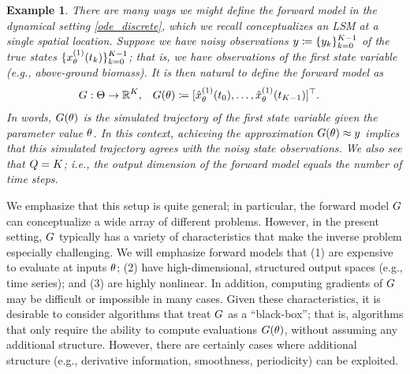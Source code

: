 \documentclass[12pt]{article}
\newtheorem{example}{Example}
\begin{document}
\begin{example}
There are many ways we might define the forward model in the dynamical setting \ref{ode_discrete}, which we recall 
conceptualizes an LSM at a single spatial location. Suppose we have noisy observations 
$\obs \Def \{\indexTime{\obs}\}_{\timeIdx=0}^{\Ntime-1}$ 
of the true states $\{\indexState[1]{\state}_{\Par}(\indexTime{\Time})\}_{\timeIdx=0}^{\Ntime-1}$; that is, we have observations of 
the first state variable (e.g., above-ground biomass). It is then natural to define the forward model as 
\begin{align}
&\fwd: \parSpace \to \R^{\Ntime}, && \fwd(\Par) 
\Def [\indexState[1]{\stateApprox}_{\Par}(\indexTime[0]{\Time}), \dots, \indexState[1]{\stateApprox}_{\Par}(\indexTime[\Ntime-1]{\Time})]^\top. \label{fwd_model}
\end{align}
In words, $\fwd(\Par)$ is the simulated trajectory of the first state variable given the parameter value $\Par$. In this context, achieving 
the approximation $\fwd(\Par) \approx \obs$ implies that this simulated trajectory agrees with the noisy state observations. We also 
see that $\dimObs = \Ntime$; i.e., the output dimension of the forward model equals the number of time steps. 
\end{example}

We emphasize that this setup is quite general; in particular, the forward model $\fwd$ can conceptualize a wide array 
of different problems. However, in the present setting, $\fwd$ typically has a variety of characteristics that make 
the inverse problem especially challenging. We will emphasize forward models that (1) are expensive to evaluate 
at inputs $\Par$; (2) have high-dimensional, structured output spaces (e.g., time series); and (3) are highly nonlinear. 
In addition, computing gradients of $\fwd$ may be difficult or impossible in many cases. Given these characteristics, 
it is desirable to consider algorithms that treat $\fwd$ as a ``black-box''; that is, algorithms that only require the 
ability to compute evaluations $\fwd(\Par)$, without assuming any additional structure. However, there are certainly 
cases where additional structure (e.g., derivative information, smoothness, periodicity) can be exploited. 
\end{document}
